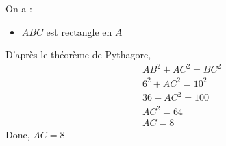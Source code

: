 {\begin{minipage}{0.45\textwidth}
\begin{figure}[H]
        \end{figure}
        On a :
        \begin{itemize}
            \item $ABC$ est rectangle en $A$
        \end{itemize} 
        D'après le théorème de Pythagore,
        \begin{align*}
            &AB^2+AC^2=BC^2\\
            &6^2 + AC^2=10^2\\
            &36 +AC^2=100\\
            &AC^2=64\\
            &AC=8
        \end{align*} 
        Donc, $AC=8$
    \end{minipage}
}
